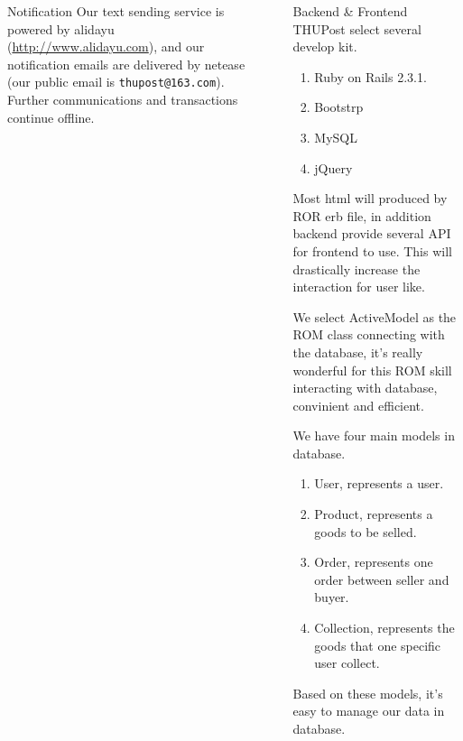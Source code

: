 \documentclass[final]{beamer}
\newlength{\sepwid}
\newlength{\onecolwid}
\begin{document}
\begin{frame}[t]
\begin{columns}[t]
\begin{column}{\onecolwid}
\begin{block}{Notification}
            Our text sending service is powered by alidayu (\url{http://www.alidayu.com}), and our notification
            emails are delivered by netease (our public email is \texttt{thupost@163.com}). Further communications and
            transactions continue offline.
        \end{block}



    \end{column} %
    \begin{column}{\sepwid}\end{column} %
    \begin{column}{\onecolwid}\vspace{-.6in} %
    

        \begin{block}{Backend \& Frontend}
        THUPost select several develop kit.
        \begin{enumerate}
        \item Ruby on Rails 2.3.1.
        \item Bootstrp
        \item MySQL
        \item jQuery
        \end{enumerate}

        Most html will produced by ROR erb file, in addition backend provide several API for frontend to use. This will drastically increase the interaction for user like.

        We select ActiveModel as the ROM class connecting with the database, it's really wonderful for this ROM skill interacting with database, convinient and efficient.

        We have four main models in database.
        \begin{enumerate}
        \item User, represents a user.
        \item Product, represents a goods to be selled.
        \item Order, represents one order between seller and buyer.
        \item Collection, represents the goods that one specific user collect.
        \end{enumerate}
        Based on these models, it's easy to manage our data in database.
        \end{block}


\end{column}
\end{columns}
\end{frame}
\end{document}
